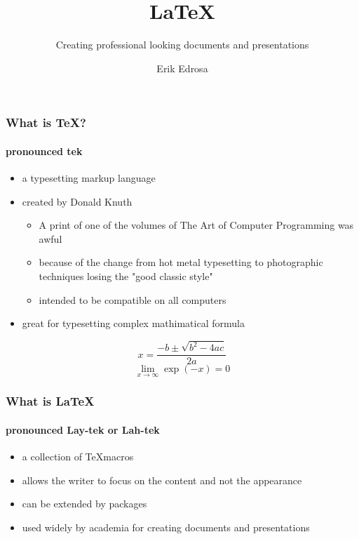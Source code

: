 \documentclass{beamer}
\title {{\LaTeX}}
\subtitle{Creating professional looking 
          documents and presentations}
\author{Erik Edrosa}
\institute [PLUG]{Panther Linux User Group}
\date{}
\begin{document}
\lstset{language=[LaTeX]TeX}
  \frame{\titlepage}
  \begin{frame}
  \frametitle{What is \TeX?}
  \framesubtitle{pronounced tek}
  \begin{itemize}
    \item a typesetting markup language
    \item created by Donald Knuth
    \begin{itemize}
      \item A print of one of the volumes of The Art of Computer Programming was awful
      \item because of the change from hot metal typesetting to photographic techniques losing the "good classic style"
      \item intended to be compatible on all computers
    \end{itemize}
    \item great for typesetting complex mathimatical formula
  \end{itemize}
  \[ x = \frac{-b\pm \sqrt{b^2 - 4ac}}{2a} \]
  \[\lim_{x \to \infty} \exp(-x) = 0 \]
  \end{frame}
  \begin{frame}
    \frametitle{What is {\LaTeX}}
    \framesubtitle{pronounced Lay-tek or Lah-tek}
    \begin{itemize}
      \item a collection of \TeX macros
      \item allows the writer to focus on the content and not the appearance
      \item can be extended by packages
      \item used widely by academia for creating documents and presentations
    \end{itemize}
  \end{frame}
\end{document}
